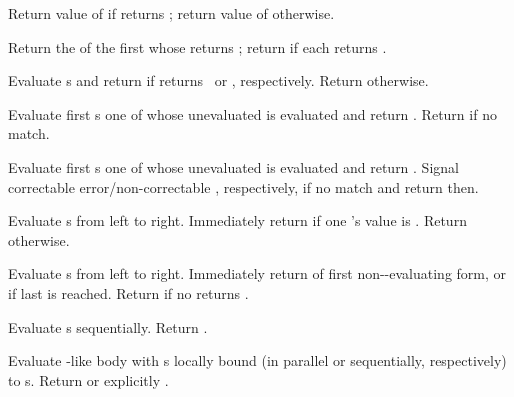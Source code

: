 \begin{LIST}{1cm}

  {Return value of
   if  returns \T; return value of
   otherwise.
  }

  {
  Return the  of the first
   whose  returns \T; return
  \retval{\NIL} if each  returns \NIL.
  }

  {
  Evaluate s and return  if
   returns \T\ or \NIL, respectively. Return \retval{\NIL} otherwise.
  }

  {
  Evaluate first s one of whose unevaluated  is
   evaluated  and return .
  Return  if no  match. 
  }

  {
  Evaluate first s one of whose unevaluated  is  evaluated
   and return . Signal correctable error/non-correctable ,
  respectively, if no  match and return \retval{\NIL} then.
  }

  {
  Evaluate s from left to
  right. Immediately return \retval{\NIL} if one 's value is \NIL. Return
   otherwise.
  }

  {
  Evaluate s from left to
  right. Immediately return  of first
  non-\NIL-evaluating form, or  if last 
  is reached. Return \retval{\NIL} if no  returns \T.
  }

  {Evaluate s sequentially. Return
  .
  }

  {
  Evaluate -like body with s locally bound (in parallel or sequentially, respectively) to
  s. Return \retval{\NIL} or explicitly
  . 
  }


\end{LIST}
